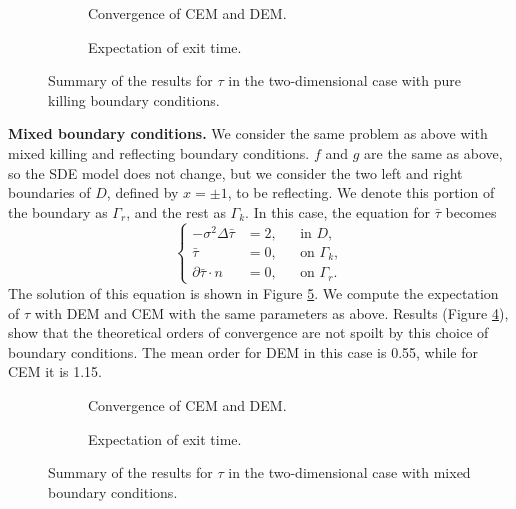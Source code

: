 \begin{figure}[t]
    \centering
    \begin{subfigure}{0.49\linewidth}
        \centering
        \resizebox{1\linewidth}{!}{ }  
        \caption{Convergence of CEM and DEM.}
        \label{fig:KillTwoD}
    \end{subfigure}
    \begin{subfigure}{0.49\linewidth}
        \centering
        \resizebox{1\linewidth}{!}{ }  
        \caption{Expectation of exit time.}
        \label{fig:TauExact2DKill}
    \end{subfigure}    
    \caption{Summary of the results for $\tau$ in the two-dimensional case with pure killing boundary conditions.}
    \label{fig:OrdersTwoDKill}
\end{figure}
\vspace{2mm}
\noindent\textbf{Mixed boundary conditions.} We consider the same problem as above with mixed killing and reflecting boundary conditions. $f$ and $g$ are the same as above, so the SDE model does not change, but we consider the two left and right boundaries of $D$, defined by $x = \pm 1$, to be reflecting. We denote this portion of the boundary as $\Gamma_r$, and the rest as $\Gamma_k$. In this case, the equation for $\bar\tau$ becomes
\begin{equation}\label{eq:PDETau2DKilling}
	\left \{
  	\begin{aligned}
	- \sigma^2 \Delta \bar \tau &= 2, && \text{in } D, \\
	\bar \tau &= 0, && \text{on } \Gamma_k, \\
	\partial \bar \tau \cdot n &= 0, && \text{on } \Gamma_r.
	\end{aligned} \right.
\end{equation}
The solution of this equation is shown in Figure \ref{fig:TauExact2DRefl}. We compute the expectation of $\tau$ with DEM and CEM with the same parameters as above. Results (Figure \ref{fig:ReflTwoD}), show that the theoretical orders of convergence are not spoilt by this choice of boundary conditions. The mean order for DEM in this case is 0.55, while for CEM it is 1.15.


\begin{figure}[t]
    \centering
    \begin{subfigure}{0.49\linewidth}
        \centering
        \resizebox{1\linewidth}{!}{ }  
        \caption{Convergence of CEM and DEM.}
        \label{fig:ReflTwoD}
    \end{subfigure}
    \begin{subfigure}{0.49\linewidth}
        \centering
        \resizebox{1\linewidth}{!}{ }  
        \caption{Expectation of exit time.}
        \label{fig:TauExact2DRefl}
    \end{subfigure}    
    \caption{Summary of the results for $\tau$ in the two-dimensional case with mixed boundary conditions.}
    \label{fig:OrdersTwoDRefl}
\end{figure}

